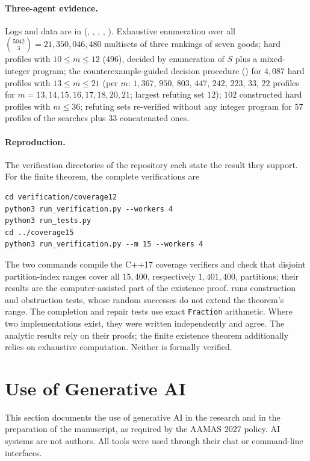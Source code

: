 \documentclass[11pt]{article}
\theoremstyle{definition}
\begin{document}
\paragraph{Three-agent evidence.}
Logs and data are in  (, , , , ). Exhaustive enumeration over all $\binom{5042}{3}=21{,}350{,}046{,}480$ multisets of three rankings of seven goods; hard profiles with $10\le m\le12$ ($496$), decided by enumeration of $S$ plus a mixed-integer program; the counterexample-guided decision procedure () for $4{,}087$ hard profiles with $13\le m\le21$ (per $m$: $1{,}367$, $950$, $803$, $447$, $242$, $223$, $33$, $22$ profiles for $m=13,14,15,16,17,18,20,21$; largest refuting set $12$); $102$ constructed hard profiles with $m\le36$; refuting sets re-verified without any integer program for $57$ profiles of the searches plus $33$ concatenated ones.

\paragraph{Reproduction.}
The verification directories of the repository each state the result they support. For the finite theorem, the complete verifications are
\begin{verbatim}
cd verification/coverage12
python3 run_verification.py --workers 4
python3 run_tests.py
cd ../coverage15
python3 run_verification.py --m 15 --workers 4
\end{verbatim}
The two  commands compile the C++17 coverage verifiers and check that disjoint partition-index ranges cover all $15{,}400$, respectively $1{,}401{,}400$, partitions; their results are the computer-assisted part of the existence proof.  runs construction and obstruction tests, whose random successes do not extend the theorem's range. The completion and repair tests use exact \texttt{Fraction} arithmetic. Where two implementations exist, they were written independently and agree. The analytic results rely on their proofs; the finite existence theorem additionally relies on exhaustive computation. Neither is formally verified.

\section{Use of Generative AI}\label{app:ai}
This section documents the use of generative AI in the research and in the preparation of the manuscript, as required by the AAMAS 2027 policy. AI systems are not authors. All tools were used through their chat or command-line interfaces.
\end{document}
